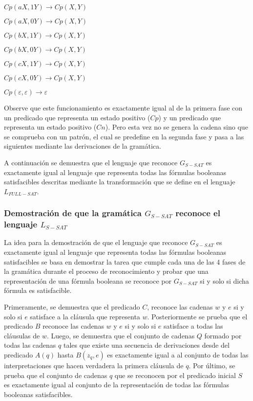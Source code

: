 \begin{itemize}
\begin{enumerate}[start=23]
\begin{multicols}{2}
                  \item $Cp(aX,1Y) \to Cp(X,Y)$
                  \item $Cp(aX,0Y) \to Cp(X,Y)$
                  \item $Cp(bX,1Y) \to Cp(X,Y)$
                  \item $Cp(bX,0Y) \to Cp(X,Y)$
                  \item $Cp(cX,1Y) \to Cp(X,Y)$
                  \item $Cp(cX,0Y) \to Cp(X,Y)$
                  \item $Cp(\varepsilon,\varepsilon)\to \varepsilon$
              \end{multicols}
          \end{enumerate}

          Observe que este funcionamiento es exactamente igual al de la primera fase con un predicado que representa un
          estado positivo ($Cp$) y un predicado que representa un estado positivo ($Cn$). Pero esta vez no se genera
          la cadena sino que se comprueba con un patrón, el cual se predefine en la segunda fase y pasa a las
          siguientes mediante las derivaciones de la gramática.

\end{itemize}

A continuación se demuestra que el lenguaje que reconoce $G_{S-SAT}$ es exactamente igual al lenguaje que
representa todas las fórmulas booleanas satisfacibles descritas mediante la transformación que se define
en el lenguaje $L_{FULL-SAT}$.

\subsubsection{Demostración de que la gramática $G_{S-SAT}$ reconoce el lenguaje $L_{S-SAT}$}

La idea para la demostración de que el lenguaje que reconoce $G_{S-SAT}$ es exactamente igual al lenguaje que
representa todas las fórmulas booleanas satisfacibles se basa en demostrar la tarea que cumple cada una de las 4 fases de la gramática
durante el proceso de reconocimiento y probar que una representación de una fórmula booleana
se reconoce por $G_{S-SAT}$ si y solo si dicha fórmula es satisfacible.

Primeramente, se demuestra que el predicado $C$, reconoce las cadenas $w$ y $e$
si y solo si $e$ satisface a la cláusula que representa $w$. Posteriormente se prueba que el predicado $B$ reconoce las cadenas $w$ y $e$ si y solo si $e$ satisface a todas las
cláusulas de $w$. Luego, se demuestra que el conjunto de cadenas $Q$ formado por todas las cadenas $q$ tales que existe una secuencia de
derivaciones desde del predicado $A(q)$ hasta $B(z_q,e)$ es exactamente igual a al conjunto de todas las
interpretaciones que hacen verdadera la primera cláusula de $q$. Por último, se prueba que el conjunto de cadenas $q$ que se
reconocen por el predicado inicial $S$ es exactamente igual al conjunto de la representación de
todas las fórmulas booleanas satisfacibles.

